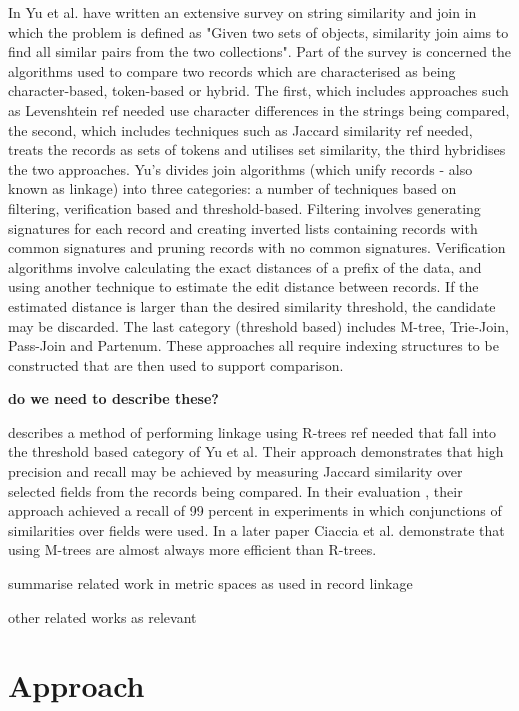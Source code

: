 \documentclass{llncs}
\begin{document}
In \cite{Yu2016} Yu et al. have written an extensive survey on string similarity and join in which the problem is defined as "Given two sets of objects, similarity join aims to find all similar pairs from the two collections". Part of the survey is concerned the  algorithms used to compare two records which are characterised as being character-based, token-based or hybrid. The first, which includes approaches such as Levenshtein {ref needed} use character differences in the strings being compared, the second, which includes techniques such as Jaccard similarity {ref needed}, treats the records as sets of tokens and utilises set similarity, the third hybridises the two approaches. Yu's divides join algorithms (which unify records - also known as linkage) into three categories: a number of techniques based on filtering, verification based and threshold-based. Filtering involves generating signatures for each record and creating inverted lists containing records with common signatures and pruning records with no common signatures. Verification algorithms involve calculating the exact distances of a prefix of the data, and using another technique to estimate the edit distance between records. If the estimated distance is larger than the desired similarity threshold, the candidate may be discarded. The last category (threshold based) includes M-tree, Trie-Join, Pass-Join and Partenum. These approaches all require indexing structures to be constructed that are then used to support comparison.  

{\textbf{do we need to describe these?}}

 \cite{Li2006} describes a method of performing linkage using R-trees {ref needed} that fall into the threshold based category of Yu et al. Their approach demonstrates that high precision and recall may be achieved by measuring Jaccard similarity over selected fields from the records being compared. In their evaluation , their approach achieved a recall of 99 percent in experiments in which conjunctions of similarities over fields were used. In a later paper \cite{Ciaccia97indexingmetric}  Ciaccia et al. demonstrate that using M-trees are almost always more efficient than R-trees.

summarise related work in metric spaces as used in record linkage

other related works as relevant


\section{Approach}
\label{sec-approach}
\end{document}
